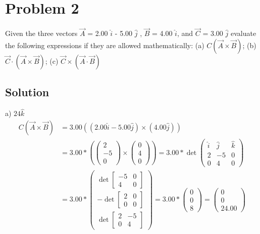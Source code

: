 \documentclass[12pt]{article}
\begin{document}
\pagebreak
\section*{Problem 2}
Given the three vectors $\vec{A}$ = 2.00 $\hat{i}$ - 5.00 $\hat{j}$ , $\vec{B}$ = 4.00 $\hat{i}$, and $\vec{C}$ = 3.00 $\hat{j}$ evaluate the following expressions if they are allowed mathematically: (a) $C (\vec{A} \times \vec{B})$; (b) $\vec{C} \cdot ( \vec{A} \times \vec{B} )$; (c) $ \vec{C} \times (\vec{A} \cdot \vec{B}) $

\subsection*{Solution}
a) $24 \hat{k}$
\begin{align*}
    C (\vec{A} \times \vec{B}) &= 3.00((2.00 \hat{i} - 5.00 \hat{j}) \times (4.00 \hat{j}))\\
            &= 3.00 * (\begin{pmatrix} 2\\ -5\\ 0 \end{pmatrix} \times \begin{pmatrix} 0\\ 4\\ 0 \end{pmatrix})
            = 3.00 * \det \begin{pmatrix} \hat{i} & \hat{j} & \hat{k}\\ 2 & -5 & 0\\ 0 & 4 & 0 \end{pmatrix}\\
            &= 3.00 * \begin{pmatrix} \det\left[\begin{smallmatrix} -5 & 0\\ 4 & 0 \end{smallmatrix}\right]\\ -\det\left[\begin{smallmatrix} 2 & 0\\ 0 & 0 \end{smallmatrix}\right]\\ \det\left[\begin{smallmatrix} 2 & -5\\ 0 & 4 \end{smallmatrix}\right] \end{pmatrix}
            = 3.00 * \begin{pmatrix} 0\\ 0\\ 8 \end{pmatrix}
            = \boxed{ \begin{pmatrix} 0\\ 0\\ 24.00 \end{pmatrix} }
\end{align*}
\end{document}
